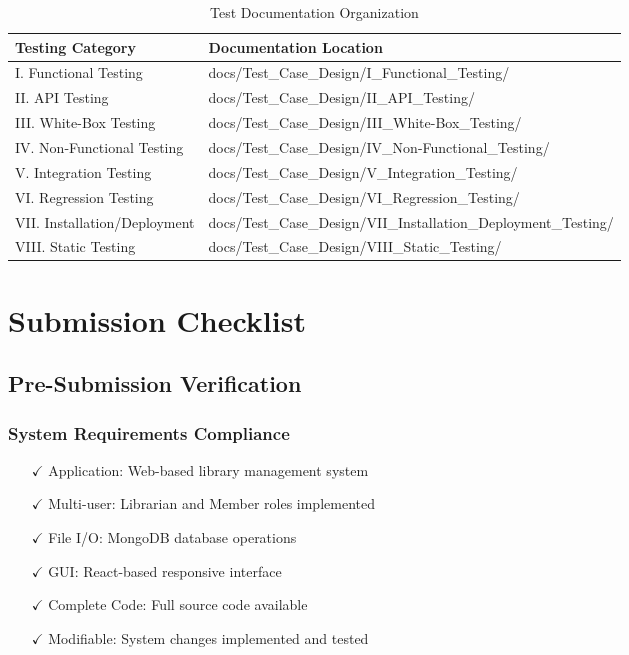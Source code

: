 \documentclass[12pt,a4paper]{article}
\begin{document}
\begin{table}[h]
\centering
\begin{tabular}{|l|l|}
\hline
\textbf{Testing Category} & \textbf{Documentation Location} \\
\hline
I. Functional Testing & docs/Test\_Case\_Design/I\_Functional\_Testing/ \\
II. API Testing & docs/Test\_Case\_Design/II\_API\_Testing/ \\
III. White-Box Testing & docs/Test\_Case\_Design/III\_White-Box\_Testing/ \\
IV. Non-Functional Testing & docs/Test\_Case\_Design/IV\_Non-Functional\_Testing/ \\
V. Integration Testing & docs/Test\_Case\_Design/V\_Integration\_Testing/ \\
VI. Regression Testing & docs/Test\_Case\_Design/VI\_Regression\_Testing/ \\
VII. Installation/Deployment & docs/Test\_Case\_Design/VII\_Installation\_Deployment\_Testing/ \\
VIII. Static Testing & docs/Test\_Case\_Design/VIII\_Static\_Testing/ \\
\hline
\end{tabular}
\caption{Test Documentation Organization}
\end{table}

\section{Submission Checklist}

\subsection{Pre-Submission Verification}

\subsubsection{System Requirements Compliance}
\begin{itemize}[leftmargin=*]
    \item[$\checkmark$] Application: Web-based library management system
    \item[$\checkmark$] Multi-user: Librarian and Member roles implemented
    \item[$\checkmark$] File I/O: MongoDB database operations
    \item[$\checkmark$] GUI: React-based responsive interface
    \item[$\checkmark$] Complete Code: Full source code available
    \item[$\checkmark$] Modifiable: System changes implemented and tested
\end{itemize}
\end{document}
